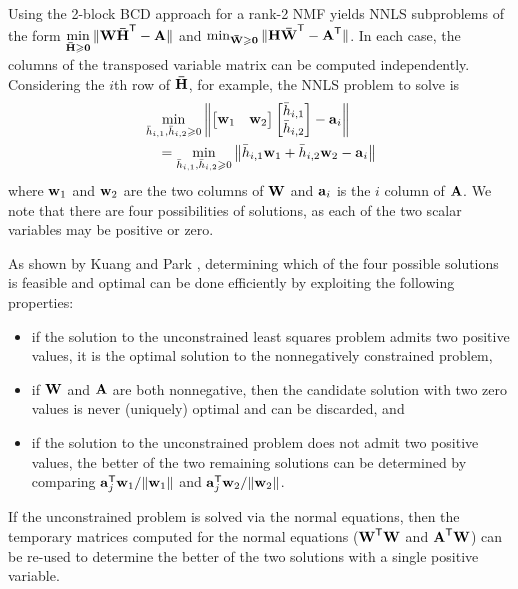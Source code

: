 \documentclass[conference,compsoc]{IEEEtran}
\begin{document}
Using the 2-block BCD approach for a rank-2 NMF yields NNLS subproblems of the form $\displaystyle \min_{\M[\bar]{H} \geq \M{0}} \|\M{W}\M[\bar]{H}^\Tra-\M{A}\|$ and $\min_{\M[\bar]{W} \geq \M{0}} \|\M{H}\M[\bar]{W}^\Tra-\M{A}^\Tra\|$.
In each case, the columns of the transposed variable matrix can be computed independently.
Considering the $i$th row of $\M[\bar]{H}$, for example, the NNLS problem to solve is
\begin{align*}
\begin{multlined}
\min_{\ME[\bar]{H}{i,1},\ME[\bar]{H}{i,2} \geq 0} \left\|\begin{bmatrix} \V{w}_1 & \V{w}_2 \end{bmatrix} \begin{bmatrix}\ME[\bar]{H}{i,1} \\ \ME[\bar]{H}{i,2} \end{bmatrix} - \V{A}_i \right\| \\ = \min_{\ME[\bar]{H}{i,1},\ME[\bar]{H}{i,2} \geq 0} \left\|\ME[\bar]{H}{i,1} \V{w}_1 + \ME[\bar]{H}{i,2} \V{w}_2 - \V{a}_i \right\|
\end{multlined}
\end{align*}
where $\V{w}_1$ and $\V{W}_2$ are the two columns of $\M{W}$ and $\V{a}_i$ is the $i$ column of $\M{A}$.
We note that there are four possibilities of solutions, as each of the two scalar variables may be positive or zero.

As shown by Kuang and Park \cite{KP13}, determining which of the four possible solutions is feasible and optimal can be done efficiently by exploiting the following properties:
\begin{itemize}
	\item if the solution to the unconstrained least squares problem admits two positive values, it is the optimal solution to the nonnegatively constrained problem,
	\item if $\M{W}$ and $\M{A}$ are both nonnegative, then the candidate solution with two zero values is never (uniquely) optimal and can be discarded, and
	\item if the solution to the unconstrained problem does not admit two positive values, the better of the two remaining solutions can be determined by comparing $\V{a}_{j}^\Tra\V{w}_1 / \|\V{w}_1\|$ and $\V{a}_{j}^\Tra\V{w}_2 / \|\V{w}_2\|$.
\end{itemize}
If the unconstrained problem is solved via the normal equations, then the temporary matrices computed for the normal equations ($\M{W}^\Tra\M{W}$ and $\M{A}^\Tra\M{W}$) can be re-used to determine the better of the two solutions with a single positive variable.
\end{document}
